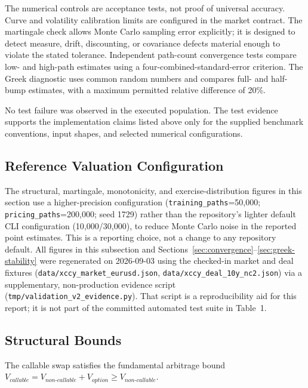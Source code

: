 \documentclass[conference]{IEEEtran}
\begin{document}
The numerical controls are acceptance tests, not proof of universal accuracy. Curve and volatility calibration limits are configured in the market contract. The martingale check allows Monte Carlo sampling error explicitly; it is designed to detect measure, drift, discounting, or covariance defects material enough to violate the stated tolerance. Independent path-count convergence tests compare low- and high-path estimates using a four-combined-standard-error criterion. The Greek diagnostic uses common random numbers and compares full- and half-bump estimates, with a maximum permitted relative difference of 20\%.

No test failure was observed in the executed population. The test evidence supports the implementation claims listed above only for the supplied benchmark conventions, input shapes, and selected numerical configurations.

\subsection{Reference Valuation Configuration}
\label{sec:functional-validation}

The structural, martingale, monotonicity, and exercise-distribution figures in this section use a higher-precision configuration (\texttt{training\_paths}=50{,}000; \texttt{pricing\_paths}=200{,}000; seed 1729) rather than the repository's lighter default CLI configuration (10{,}000/30{,}000), to reduce Monte Carlo noise in the reported point estimates. This is a reporting choice, not a change to any repository default. All figures in this subsection and Sections~\ref{sec:convergence}--\ref{sec:greek-stability} were regenerated on 2026-09-03 using the checked-in market and deal fixtures (\texttt{data/xccy\_market\_eurusd.json}, \texttt{data/xccy\_deal\_10y\_nc2.json}) via a supplementary, non-production evidence script (\texttt{tmp/validation\_v2\_evidence.py}). That script is a reproducibility aid for this report; it is not part of the committed automated test suite in Table~1.

\subsection{Structural Bounds}

The callable swap satisfies the fundamental arbitrage bound $V_{callable}=V_{non\text{-}callable}+V_{option}\geq V_{non\text{-}callable}$.
\end{document}
